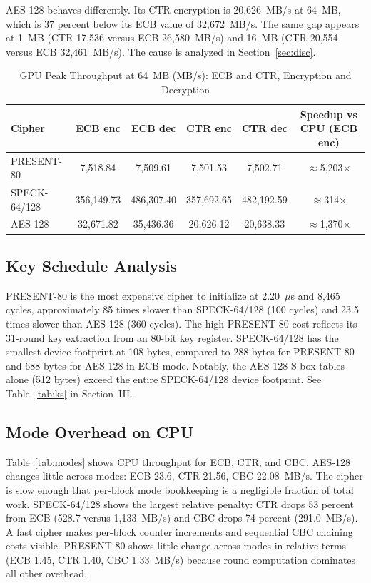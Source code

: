\documentclass[conference]{IEEEtran}
\begin{document}
AES-128 behaves differently. Its CTR encryption is 20,626~MB/s at 64~MB, which is 37 percent below
its ECB value of 32,672~MB/s. The same gap appears at 1~MB (CTR 17,536 versus ECB 26,580~MB/s) and
16~MB (CTR 20,554 versus ECB 32,461~MB/s). The cause is analyzed in Section~\ref{sec:disc}.

\begin{table}[t]
\caption{GPU Peak Throughput at 64~MB (MB/s): ECB and CTR, Encryption and Decryption}
\label{tab:gpu}
\begin{center}
\begin{tabular}{|l|c|c|c|c|c|}
\hline
\textbf{Cipher} & \textbf{ECB enc} & \textbf{ECB dec}
  & \textbf{CTR enc} & \textbf{CTR dec} & \textbf{Speedup vs CPU (ECB enc)} \\
\hline
PRESENT-80    & 7,518.84    & 7,509.61    & 7,501.53    & 7,502.71    & $\approx$5,203$\times$ \\
SPECK-64/128  & 356,149.73  & 486,307.40  & 357,692.65  & 482,192.59  & $\approx$314$\times$   \\
AES-128       & 32,671.82   & 35,436.36   & 20,626.12   & 20,638.33   & $\approx$1,370$\times$ \\
\hline
\end{tabular}
\end{center}
\end{table}

\subsection{Key Schedule Analysis}

PRESENT-80 is the most expensive cipher to initialize at 2.20~$\mu$s and 8,465 cycles, approximately
85 times slower than SPECK-64/128 (100 cycles) and 23.5 times slower than AES-128 (360 cycles). The
high PRESENT-80 cost reflects its 31-round key extraction from an 80-bit key register. SPECK-64/128
has the smallest device footprint at 108 bytes, compared to 288 bytes for PRESENT-80 and 688 bytes
for AES-128 in ECB mode. Notably, the AES-128 S-box tables alone (512 bytes) exceed the entire
SPECK-64/128 device footprint. See Table~\ref{tab:ks} in Section~III.

\subsection{Mode Overhead on CPU}

Table~\ref{tab:modes} shows CPU throughput for ECB, CTR, and CBC. AES-128 changes little across
modes: ECB 23.6, CTR 21.56, CBC 22.08~MB/s. The cipher is slow enough that per-block mode
bookkeeping is a negligible fraction of total work. SPECK-64/128 shows the largest relative penalty:
CTR drops 53 percent from ECB (528.7 versus 1,133~MB/s) and CBC drops 74 percent (291.0~MB/s). A
fast cipher makes per-block counter increments and sequential CBC chaining costs visible. PRESENT-80
shows little change across modes in relative terms (ECB 1.45, CTR 1.40, CBC 1.33~MB/s) because
round computation dominates all other overhead.
\end{document}
